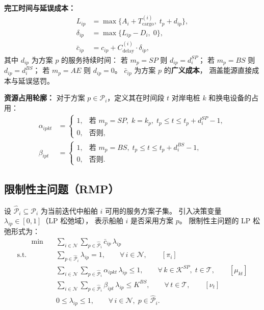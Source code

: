 \documentclass[UTF8, a4paper, 12pt]{ctexart}
\begin{document}
\noindent\textbf{完工时间与延误成本：}
\begin{align}
  L_{ip} &= \max\!\Big\{A_i + T_{\text{cargo}}^{(i)},\;
    t_p + d_{ip}\Big\},
  \label{eq:col_finish} \\
  \delta_{ip} &= \max\!\big\{L_{ip} - D_i,\; 0\big\},
  \label{eq:col_delay} \\
  \bar{c}_{ip} &= c_{ip} + C_{\text{delay}}^{(i)} \cdot \delta_{ip},
  \label{eq:col_gencost}
\end{align}
其中 $d_{ip}$ 为方案 $p$ 的服务持续时间：
若 $m_p = SP$ 则 $d_{ip} = d_i^{SP}$；
若 $m_p = BS$ 则 $d_{ip} = d_i^{BS}$；
若 $m_p = AE$ 则 $d_{ip} = 0$。
$\bar{c}_{ip}$ 为方案 $p$ 的\textbf{广义成本}，
涵盖能源直接成本与延误惩罚。

\medskip
\noindent\textbf{资源占用轮廓：}
对于方案 $p \in \mathcal{P}_i$，定义其在时间段 $t$ 对岸电桩 $k$ 和换电设备的占用：
\begin{align}
  \alpha_{ipkt} &=
  \begin{cases}
    1, & \text{若 } m_p = SP,\; k = k_p,\;
         t_p \le t \le t_p + d_i^{SP} - 1, \\
    0, & \text{否则},
  \end{cases}
  \label{eq:col_alpha} \\
  \beta_{ipt} &=
  \begin{cases}
    1, & \text{若 } m_p = BS,\;
         t_p \le t \le t_p + d_i^{BS} - 1, \\
    0, & \text{否则}.
  \end{cases}
  \label{eq:col_beta}
\end{align}

\subsection{限制性主问题（RMP）}
\label{sec:cg_rmp}

设 $\hat{\mathcal{P}}_i \subseteq \mathcal{P}_i$ 为当前迭代中船舶 $i$
可用的服务方案子集。
引入决策变量 $\lambda_{ip} \in [0,1]$（LP 松弛域），
表示船舶 $i$ 是否采用方案 $p$。
限制性主问题的 LP 松弛形式为：
\begin{align}
  [\text{RMP}] \qquad
  \min \quad & \sum_{i \in \mathcal{N}} \sum_{p \in \hat{\mathcal{P}}_i}
    \bar{c}_{ip}\, \lambda_{ip}
  \label{eq:rmp_obj} \\
  \text{s.t.} \quad
  & \sum_{p \in \hat{\mathcal{P}}_i} \lambda_{ip} = 1,
    \qquad \forall\, i \in \mathcal{N},
    \qquad [\pi_i]
  \label{eq:rmp_convex} \\
  & \sum_{i \in \mathcal{N}} \sum_{p \in \hat{\mathcal{P}}_i}
    \alpha_{ipkt}\, \lambda_{ip} \le 1,
    \qquad \forall\, k \in \mathcal{K}^{SP},\; t \in \mathcal{T},
    \qquad [\mu_{kt}]
  \label{eq:rmp_sp} \\
  & \sum_{i \in \mathcal{N}} \sum_{p \in \hat{\mathcal{P}}_i}
    \beta_{ipt}\, \lambda_{ip} \le K^{BS},
    \qquad \forall\, t \in \mathcal{T},
    \qquad [\nu_t]
  \label{eq:rmp_bs} \\
  & 0 \le \lambda_{ip} \le 1,
    \qquad \forall\, i \in \mathcal{N},\; p \in \hat{\mathcal{P}}_i.
  \label{eq:rmp_bound}
\end{align}
\end{document}
